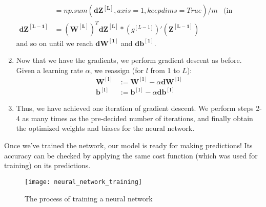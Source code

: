 \documentclass[a4paper, 12pt]{article}
\begin{document}
\begin{enumerate}
\begin{align*}
&= np.sum(\bm{dZ^{\left[L\right]}}, axis=1, keepdims=True)/m & \text{(in NumPy)} \\
\bm{dZ^{\left[L-1\right]}} &= \left(\bm{W^{\left[L\right]}}\right)^T\bm{dZ^{\left[L\right]}} * \left(g^{[L-1]}\right)'\left(\bm{Z^{\left[L-1\right]}}\right) &
\end{align*}
and so on until we reach $\bm{dW^{\left[1\right]}}$ and $\bm{db^{\left[1\right]}}$.
\item Now that we have the gradients, we perform gradient descent as before. Given a learning rate $\alpha$, we reassign (for $l$ from 1 to $L$):
\begin{align*}
\bm{W^{\left[l\right]}} &:= \bm{W^{\left[l\right]}} - \alpha\bm{dW^{\left[l\right]}} \\
\bm{b^{\left[l\right]}} &:= \bm{b^{\left[l\right]}} - \alpha\bm{db^{\left[l\right]}}
\end{align*}
\item Thus, we have achieved one iteration of gradient descent. We perform steps 2-4 as many times as the pre-decided number of iterations, and finally obtain the optimized weights and biases for the neural network.
\end{enumerate}
Once we've trained the network, our model is ready for making predictions! Its accuracy can be checked by applying the same cost function (which was used for training) on its predictions.
\begin{figure}[H]
\centering
\texttt{[image: neural\_network\_training]}
\caption{The process of training a neural network}
\end{figure}
\newpage
\end{document}
